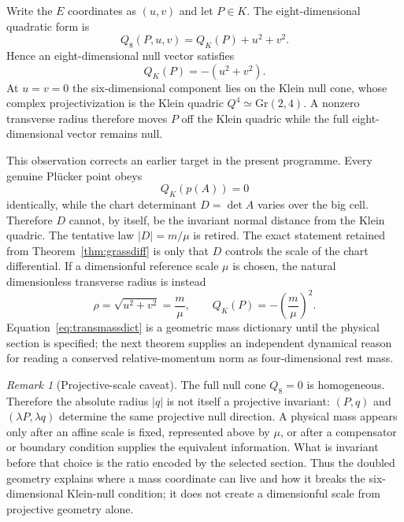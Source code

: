 \documentclass[11pt]{article}
\newcommand{\Gr}{\mathrm{Gr}}
\theoremstyle{definition}\newtheorem{definition}[theorem]{Definition}
\theoremstyle{remark}\newtheorem{remark}[theorem]{Remark}\newtheorem{conjecture}[theorem]{Conjecture}
\begin{document}
Write the $E$ coordinates as $(u,v)$ and let $P\in K$. The eight-dimensional quadratic form is
\begin{equation}\label{eq:Q8}
 \boxed{Q_8(P,u,v)=Q_K(P)+u^2+v^2.}
\end{equation}
Hence an eight-dimensional null vector satisfies
\begin{equation}\label{eq:offklein}
 \boxed{Q_K(P)=-(u^2+v^2).}
\end{equation}
At $u=v=0$ the six-dimensional component lies on the Klein null cone, whose complex projectivization is the Klein quadric $Q^4\simeq\Gr(2,4)$. A nonzero transverse radius therefore moves $P$ off the Klein quadric while the full eight-dimensional vector remains null.

This observation corrects an earlier target in the present programme. Every genuine Pl\"ucker point obeys
\begin{equation}
 Q_K(p(A))=0
\end{equation}
identically, while the chart determinant $D=\det A$ varies over the big cell. Therefore $D$ cannot, by itself, be the invariant normal distance from the Klein quadric. The tentative law $|D|=m/\mu$ is retired. The exact statement retained from Theorem~\ref{thm:grassdiff} is only that $D$ controls the scale of the chart differential. If a dimensionful reference scale $\mu$ is chosen, the natural dimensionless transverse radius is instead
\begin{equation}\label{eq:transmassdict}
 \rho=\sqrt{u^2+v^2}=\frac{m}{\mu},
 \qquad
 Q_K(P)=-\left(\frac{m}{\mu}\right)^2.
\end{equation}
Equation~\eqref{eq:transmassdict} is a geometric mass dictionary until the physical section is specified; the next theorem supplies an independent dynamical reason for reading a conserved relative-momentum norm as four-dimensional rest mass.

\begin{remark}[Projective-scale caveat]\label{rem:projectivescale}
The full null cone $Q_8=0$ is homogeneous. Therefore the absolute radius $|q|$ is not itself a projective invariant: $(P,q)$ and $(\lambda P,\lambda q)$ determine the same projective null direction. A physical mass appears only after an affine scale is fixed, represented above by $\mu$, or after a compensator or boundary condition supplies the equivalent information. What is invariant before that choice is the ratio encoded by the selected section. Thus the doubled geometry explains where a mass coordinate can live and how it breaks the six-dimensional Klein-null condition; it does not create a dimensionful scale from projective geometry alone.
\end{remark}
\end{document}
